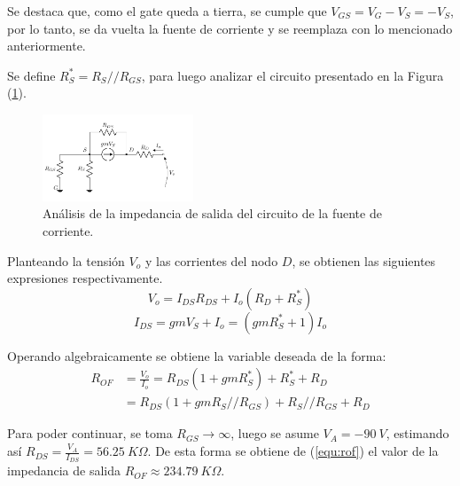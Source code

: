 Se destaca que, como el gate queda a tierra, se cumple que $V_{GS} = V_G - V_S = - V_S$, por lo tanto, se da vuelta la fuente de corriente y se reemplaza con lo mencionado anteriormente. 

Se define $R_S^* = R_S // R_{GS}$, para luego analizar el circuito presentado en la Figura (\ref{fig:incfuente2}).
\begin{figure}[H]
\centering
\hspace*{2cm}
	\includegraphics[width=0.4\textwidth, page=2]{Imagenes/ModeloIncremental.pdf}
	\caption{Análisis de la impedancia de salida del circuito de la fuente de corriente.}
\label{fig:incfuente2}
\end{figure}

Planteando la tensión $V_o$ y las corrientes del nodo $D$, se obtienen las siguientes expresiones respectivamente.
\begin{equation*}
	V_o = I_{DS} R_{DS} + I_o \left( R_D + R_S^* \right)
\end{equation*}
\begin{equation*}
	I_{DS} = gm V_S + I_o = \left( gm R_S^* + 1 \right) I_o
\end{equation*}

Operando algebraicamente se obtiene la variable deseada de la forma:
\begin{equation}
\begin{split}
	R_{OF} & = \frac{V_o}{I_o} = R_{DS} \left( 1 + gm R_S^* \right) + R_S^* + R_D \\
		   & = R_{DS} \left( 1 + gm R_S//R_{GS} \right) + R_S//R_{GS} + R_D
\end{split}
\label{equ:rof}
\end{equation}

Para poder continuar, se toma $R_{GS} \longrightarrow \infty$, luego se asume $V_A = -90 \ V$, estimando así $R_{DS} = \frac{V_A}{I_{DS}} = 56.25 \ K\Omega$. De esta forma se obtiene de (\ref{equ:rof}) el valor de la impedancia de salida $R_{OF} \approx 234.79 \ K\Omega$.


